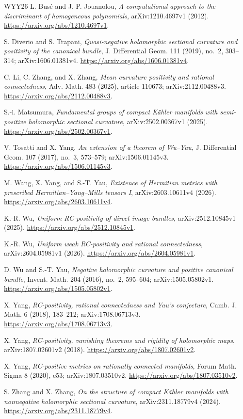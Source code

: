\documentclass[12pt]{amsart}
\theoremstyle{definition}
\theoremstyle{remark}
\numberwithin{equation}{section}
\begin{document}
\renewcommand{\refname}{References}
\begin{thebibliography}{WYY26}
 L. Bus\'e and J.-P. Jouanolou, \emph{A computational approach to the discriminant of homogeneous polynomials}, arXiv:1210.4697v1 (2012). \url{https://arxiv.org/abs/1210.4697v1}.

 S. Diverio and S. Trapani, \emph{Quasi-negative holomorphic sectional curvature and positivity of the canonical bundle}, J. Differential Geom. 111 (2019), no.~2, 303--314; arXiv:1606.01381v4. \url{https://arxiv.org/abs/1606.01381v4}.

 C. Li, C. Zhang, and X. Zhang, \emph{Mean curvature positivity and rational connectedness}, Adv. Math. 483 (2025), article 110673; arXiv:2112.00488v3. \url{https://arxiv.org/abs/2112.00488v3}.

 S.-i. Matsumura, \emph{Fundamental groups of compact K\"ahler manifolds with semi-positive holomorphic sectional curvature}, arXiv:2502.00367v1 (2025). \url{https://arxiv.org/abs/2502.00367v1}.

 V. Tosatti and X. Yang, \emph{An extension of a theorem of Wu--Yau}, J. Differential Geom. 107 (2017), no.~3, 573--579; arXiv:1506.01145v3. \url{https://arxiv.org/abs/1506.01145v3}.

 M. Wang, X. Yang, and S.-T. Yau, \emph{Existence of Hermitian metrics with prescribed Hermitian--Yang--Mills tensors I}, arXiv:2603.10611v4 (2026). \url{https://arxiv.org/abs/2603.10611v4}.

 K.-R. Wu, \emph{Uniform RC-positivity of direct image bundles}, arXiv:2512.10845v1 (2025). \url{https://arxiv.org/abs/2512.10845v1}.

 K.-R. Wu, \emph{Uniform weak RC-positivity and rational connectedness}, arXiv:2604.05981v1 (2026). \url{https://arxiv.org/abs/2604.05981v1}.

 D. Wu and S.-T. Yau, \emph{Negative holomorphic curvature and positive canonical bundle}, Invent. Math. 204 (2016), no.~2, 595--604; arXiv:1505.05802v1. \url{https://arxiv.org/abs/1505.05802v1}.

 X. Yang, \emph{RC-positivity, rational connectedness and Yau's conjecture}, Camb. J. Math. 6 (2018), 183--212; arXiv:1708.06713v3. \url{https://arxiv.org/abs/1708.06713v3}.

 X. Yang, \emph{RC-positivity, vanishing theorems and rigidity of holomorphic maps}, arXiv:1807.02601v2 (2018). \url{https://arxiv.org/abs/1807.02601v2}.

 X. Yang, \emph{RC-positive metrics on rationally connected manifolds}, Forum Math. Sigma 8 (2020), e53; arXiv:1807.03510v2. \url{https://arxiv.org/abs/1807.03510v2}.

 S. Zhang and X. Zhang, \emph{On the structure of compact K\"ahler manifolds with nonnegative holomorphic sectional curvature}, arXiv:2311.18779v4 (2024). \url{https://arxiv.org/abs/2311.18779v4}.

\end{thebibliography}
\end{document}
